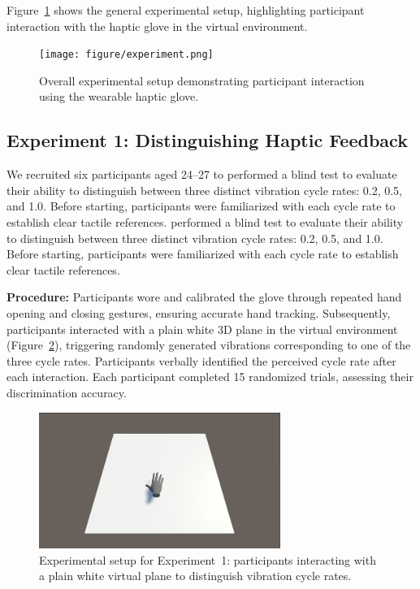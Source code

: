 \documentclass[graybox]{svmult}
\begin{document}
Figure~\ref{fig:experiment_setup} shows the general experimental setup, highlighting participant interaction with the haptic glove in the virtual environment.

\begin{figure}\centering
	\texttt{[image: figure/experiment.png]}%
	\caption{Overall experimental setup demonstrating participant interaction using the wearable haptic glove.}\label{fig:experiment_setup}
\end{figure}

\subsection{Experiment 1: Distinguishing Haptic Feedback}
We recruited six participants aged 24–27 to performed a blind test to evaluate their ability to distinguish between three distinct vibration cycle rates: 0.2, 0.5, and 1.0. Before starting, participants were familiarized with each cycle rate to establish clear tactile references.
performed a blind test to evaluate their ability to distinguish between three distinct vibration cycle rates: 0.2, 0.5, and 1.0. Before starting, participants were familiarized with each cycle rate to establish clear tactile references.

\textbf{Procedure:} Participants wore and calibrated the glove through repeated hand opening and closing gestures, ensuring accurate hand tracking. Subsequently, participants interacted with a plain white 3D plane in the virtual environment (Figure~\ref{fig:experiment1_setup}), triggering randomly generated vibrations corresponding to one of the three cycle rates. Participants verbally identified the perceived cycle rate after each interaction. Each participant completed 15 randomized trials, assessing their discrimination accuracy.

\begin{figure}[H]
	\centering
	\includegraphics[width=0.7\textwidth]{figure/ex1.png}%
	\caption{Experimental setup for Experiment~1: participants interacting with a plain white virtual plane to distinguish vibration cycle rates.}\label{fig:experiment1_setup}
\end{figure}
\end{document}
